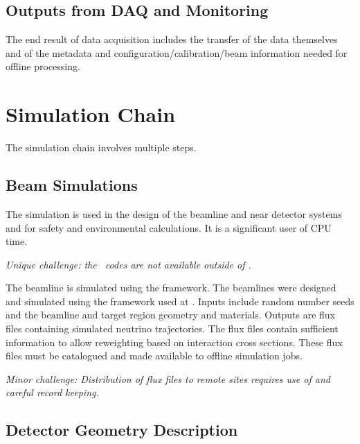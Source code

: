 \documentclass[../main-v1.tex]{subfiles}
\begin{document}
\subsection{Outputs from DAQ and Monitoring}

The end result of data acquisition includes the transfer of the data themselves and of the%
metadata and configuration/calibration/beam information needed for offline processing. 


\section{Simulation Chain }

% 
The simulation chain involves multiple steps.



\subsection{Beam Simulations}
The \cite{abs1} simulation is used in the design of the beamline and near detector systems and  for safety and environmental calculations.  It is a significant user of CPU time. 

{\it Unique challenge: the \ codes are not available outside of .}

The  
beamline is simulated using the  framework.  The  beamlines were designed and simulated using the  framework used at \cite{PhysRevAccelBeams.20.111001}.
Inputs include random number seeds and the beamline and target region geometry and materials.  Outputs are flux files containing simulated neutrino trajectories.  The flux files contain sufficient information to allow reweighting based on interaction cross sections.  These flux files must be catalogued and made available to offline simulation jobs.

{\it Minor challenge:  Distribution of flux files to remote sites requires use of  and careful record keeping.}

\subsection{Detector Geometry Description }
\end{document}
